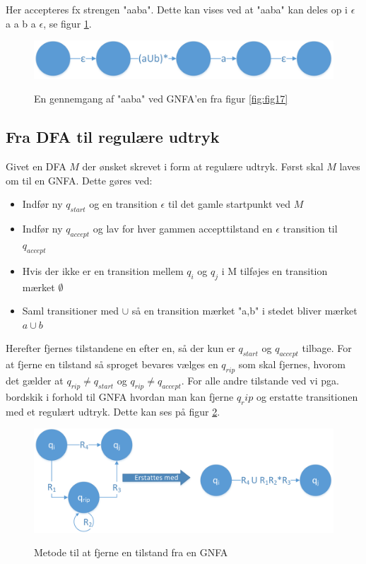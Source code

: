 \documentclass[a4paper,10pt,article]{memoir}
\begin{document}
Her accepteres fx strengen "aaba". Dette kan vises ved at "aaba" kan deles op i $\epsilon$ a a b a $\epsilon$, se figur \ref{fig:fig18}.

\begin{figure}[h]%
\centering
\includegraphics[width=\textwidth]{Fig18x.png}
\label{fig:fig18}
\caption{En gennemgang af "aaba" ved GNFA'en fra figur \ref{fig:fig17}}
\end{figure}

\subsection{Fra DFA til regulære udtryk}
Givet en DFA $M$ der ønsket skrevet i form at regulære udtryk.
Først skal $M$ laves om til en GNFA.
Dette gøres ved:
\begin{itemize}
\item Indfør ny $q_{start}$ og en transition $\epsilon$ til det gamle startpunkt ved $M$
\item Indfør ny $q_{accept}$ og lav for hver gammen accepttilstand en $\epsilon$ transition til $q_{accept}$
\item Hvis der ikke er en transition mellem $q_i$ og $q_j$ i M tilføjes en transition mærket $\emptyset$
\item Saml transitioner med $\cup$ så en transition mærket "a,b" i stedet bliver mærket $a\cup b$
\end{itemize}

Herefter fjernes tilstandene en efter en, så der kun er $q_{start}$ og $q_{accept}$ tilbage.
For at fjerne en tilstand så sproget bevares vælges en $q_{rip}$ som skal fjernes, hvorom det gælder at $q_{rip} \neq q_{start}$ og $q_{rip} \neq q_{accept}$. For alle andre tilstande ved vi pga. bordskik i forhold til GNFA hvordan man kan fjerne $q_rip$ og erstatte transitionen med et regulært udtryk. Dette kan ses på figur \ref{fig:fig19}.

\begin{figure}[h]%
\centering
\includegraphics[width=\textwidth]{Fig19x.png}
\label{fig:fig19}
\caption{Metode til at fjerne en tilstand fra en GNFA}
\end{figure}
\end{document}
